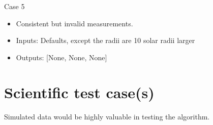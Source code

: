 \documentclass[a4paper, oneside, 11pt, article, english]{memoir}
\begin{document}
Case 5
\begin{itemize}
    \firmlist
    \item Consistent but invalid measurements. 
     \item Inputs: Defaults, except the radii are 10 solar radii larger 
     \item Outputs: [None, None, None]
\end{itemize}

\section{Scientific test case(s)}
\label{sec:test-science}

Simulated data would be highly valuable in testing the algorithm. 



\end{document}
